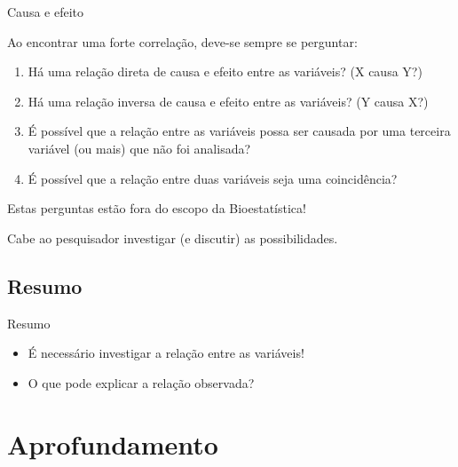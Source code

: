 \documentclass{beamer}
\begin{document}

\begin{frame}{\scriptsize Causa e efeito}
  {\small

    Ao encontrar uma forte correlação, deve-se sempre se perguntar:
  }
  \bigskip

  \begin{enumerate}
    \footnotesize
  \item Há uma relação direta de causa e efeito entre as variáveis? (X
    causa Y?)

    \bigskip
  \item Há uma relação inversa de causa e efeito entre as variáveis?
    (Y causa X?)

    \bigskip
  \item É possível que a relação entre as variáveis possa ser causada
    por uma terceira variável (ou mais) que não foi analisada?

    \bigskip
  \item É possível que a relação entre duas variáveis seja uma
    coincidência?
  \end{enumerate}
  \vfill
  \begin{block}{}
    \footnotesize
    Estas perguntas estão fora do escopo da Bioestatística!

    \bigskip
    Cabe ao pesquisador investigar (e discutir) as possibilidades.
  \end{block}
\end{frame}

\subsection{Resumo}

\begin{frame}{\scriptsize Resumo}
  \begin{itemize}
    \footnotesize
  \item É necessário investigar a relação entre as variáveis!
    \bigskip
    \bigskip
  \item O que pode explicar a relação observada?
  \end{itemize}
\end{frame}

\section{Aprofundamento}
\end{document}
